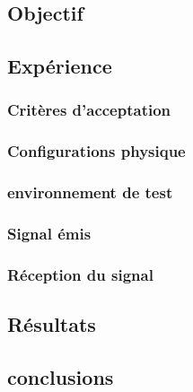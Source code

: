 \documentclass[12pt,a4paper]{report}
\author{Baptiste Lesquoy}
\begin{document}
\chapter{}
\section{Objectif}

\section{Expérience}
\subsection{Critères d'acceptation}

\subsection{Configurations physique}

\subsection{environnement de test}

\subsection{Signal émis}
\subsection{Réception du signal}
\section{Résultats}
\section{conclusions}
\end{document}
